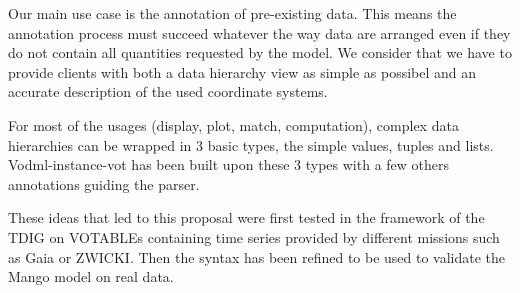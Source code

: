 \documentclass[11pt,a4paper]{ivoa}
\begin{document}
Our main use case is the annotation  of pre-existing data. This  means the annotation process must succeed whatever the way data are arranged even if they do not contain all quantities requested by the model.  
We consider that we have to provide clients with both a data hierarchy view as simple as possibel and an accurate description of the used coordinate systems. 

For most of the usages (display, plot, match, computation),  complex data hierarchies can be wrapped in 3 basic types, the simple values,  tuples and  lists. Vodml-instance-vot  has been built upon these 3 types with a few others annotations guiding the parser.

These ideas that led to this proposal were first tested in the framework of the TDIG on VOTABLEs containing time series provided by different missions such as Gaia or ZWICKI. Then the syntax has been refined to be used to validate the Mango model on real data.

\fi








\end{document}
